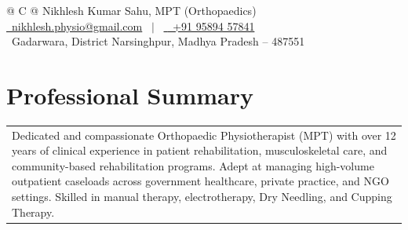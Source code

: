 \documentclass[a4paper,10pt]{article}
\newcommand{\customHeading}[1]{
    \section{\texorpdfstring{#1 \hrulefill}{}}
}
\begin{document}
\pagestyle{empty}


\begin{tabularx}{\linewidth}{@{} C @{}}
\Huge{Nikhlesh Kumar Sahu, MPT (Orthopaedics)} \\[7.5pt]


\href{mailto:nikhlesh.physio@gmail.com}{\raisebox{-0.05\height}
{\textnormal{\textcolor{yt}{\faEnvelope}}}
\ nikhlesh.physio@gmail.com}
\ $|$ \
\href{tel:+919589457841}{\raisebox{-0.05\height}
{\textnormal{\textcolor{gray}{\faMobile}}}
\ +91 95894 57841}
\\[3.0pt]
{\raisebox{-0.05\height}
{\textnormal{\textcolor{gray}{\faMapMarker}}}
\ Gadarwara, District Narsinghpur, Madhya Pradesh -- 487551}
\end{tabularx}



\customHeading{Professional Summary}
\begin{tabularx}{\linewidth}{ @{}X@{} }
Dedicated and compassionate Orthopaedic Physiotherapist (MPT) with over 12 years of clinical experience in patient rehabilitation, musculoskeletal care, and community-based rehabilitation programs. Adept at managing high-volume outpatient caseloads across government healthcare, private practice, and NGO settings. Skilled in manual therapy, electrotherapy, Dry Needling, and Cupping Therapy.
\end{tabularx}


\end{document}
